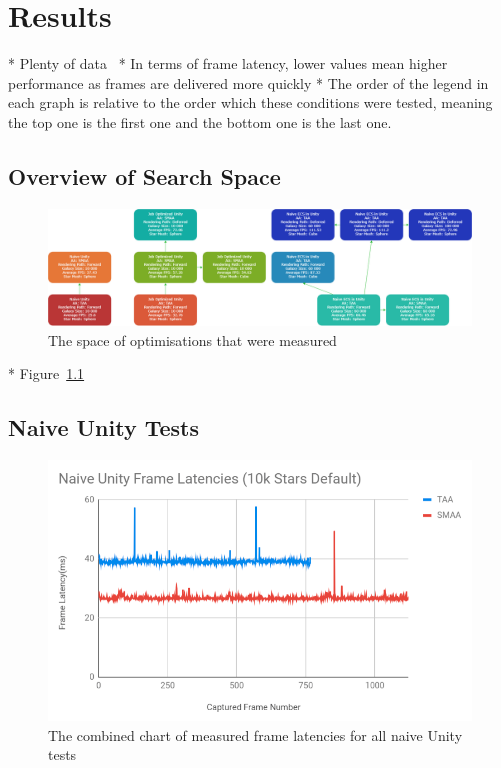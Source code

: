 \chapter{Results}
* Plenty of data~\cite{projectSpreadsheet}
* In terms of frame latency, lower values mean higher performance as frames are delivered more quickly
* The order of the legend in each graph is relative to the order which these conditions were tested, meaning the top one is the first one and the bottom one is the last one. 

\section{Overview of Search Space}
\begin{figure}[tbph]
    \centering
    \includegraphics[width=1\textwidth]{Figures/SearchSpace.png}
    \caption[Optimisation Search Space And Combinations]{The space of optimisations that were measured}
    \label{fig:searchspace}
\end{figure}

* Figure~\ref{fig:searchspace}

\section{Naive Unity Tests}
\begin{figure}[!p]
    \centering
    \includegraphics[width=1\textwidth]{Figures/naiveUnityLatencies.png}
    \caption[Combined Frame Latency Chart for Naive Unity Tests]{The combined chart of measured frame latencies for all naive Unity tests}
    \label{fig:naiveUnityLatency}
\end{figure}

